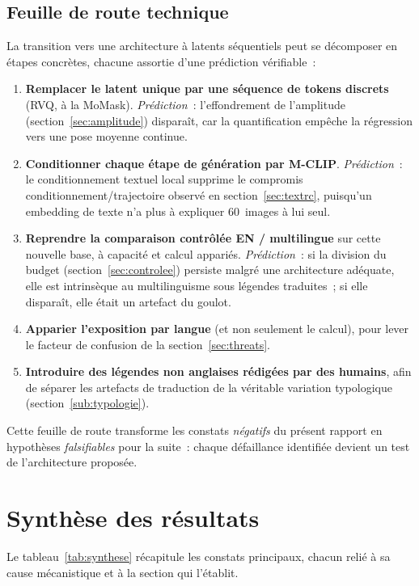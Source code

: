 \documentclass[12pt,a4paper,oneside]{report}
\theoremstyle{definition}
\theoremstyle{plain}
\begin{document}
\subsection{Feuille de route technique}

La transition vers une architecture à latents séquentiels peut se décomposer en
étapes concrètes, chacune assortie d'une prédiction vérifiable~:

\begin{enumerate}[leftmargin=*]
\item \textbf{Remplacer le latent unique par une séquence de tokens discrets}
(RVQ, à la MoMask). \emph{Prédiction}~: l'effondrement de l'amplitude
(section~\ref{sec:amplitude}) disparaît, car la quantification empêche la
régression vers une pose moyenne continue.
\item \textbf{Conditionner chaque étape de génération par M-CLIP}. \emph{Prédiction}~:
le conditionnement textuel local supprime le compromis
conditionnement/trajectoire observé en section~\ref{sec:textrc}, puisqu'un
embedding de texte n'a plus à expliquer 60~images à lui seul.
\item \textbf{Reprendre la comparaison contrôlée EN / multilingue} sur cette
nouvelle base, à capacité et calcul appariés. \emph{Prédiction}~: si la division
du budget (section~\ref{sec:controlee}) persiste malgré une architecture adéquate,
elle est intrinsèque au multilinguisme sous légendes traduites~; si elle
disparaît, elle était un artefact du goulot.
\item \textbf{Apparier l'exposition par langue} (et non seulement le calcul), pour
lever le facteur de confusion de la section~\ref{sec:threats}.
\item \textbf{Introduire des légendes non anglaises rédigées par des humains},
afin de séparer les artefacts de traduction de la véritable variation typologique
(section~\ref{sub:typologie}).
\end{enumerate}

Cette feuille de route transforme les constats \emph{négatifs} du présent rapport
en hypothèses \emph{falsifiables} pour la suite~: chaque défaillance identifiée
devient un test de l'architecture proposée.

\section{Synthèse des résultats}
\label{sec:synthese}

Le tableau~\ref{tab:synthese} récapitule les constats principaux, chacun relié à
sa cause mécanistique et à la section qui l'établit.
\end{document}
